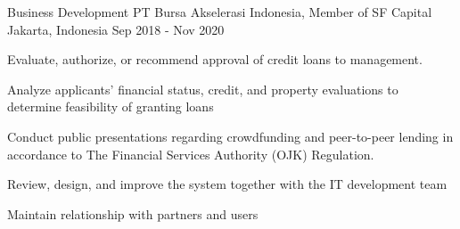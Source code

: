 \begin{cventries}
  \cventry
    {Business Development} %
    {PT Bursa Akselerasi Indonesia, Member of SF Capital} %
    {Jakarta, Indonesia} %
    {Sep 2018 - Nov 2020} %
    {
      \begin{cvitems} %
        \item {Evaluate, authorize, or recommend approval of credit loans to management.}
        \item {Analyze applicants’ financial status, credit, and property evaluations to determine feasibility of granting loans}
        \item {Conduct public presentations regarding crowdfunding and peer-to-peer lending in accordance to The Financial Services Authority (OJK) Regulation.}
        \item {Review, design, and improve the system together with the IT development team}
        \item {Maintain relationship with partners and users}
      \end{cvitems}
    }


\end{cventries}
